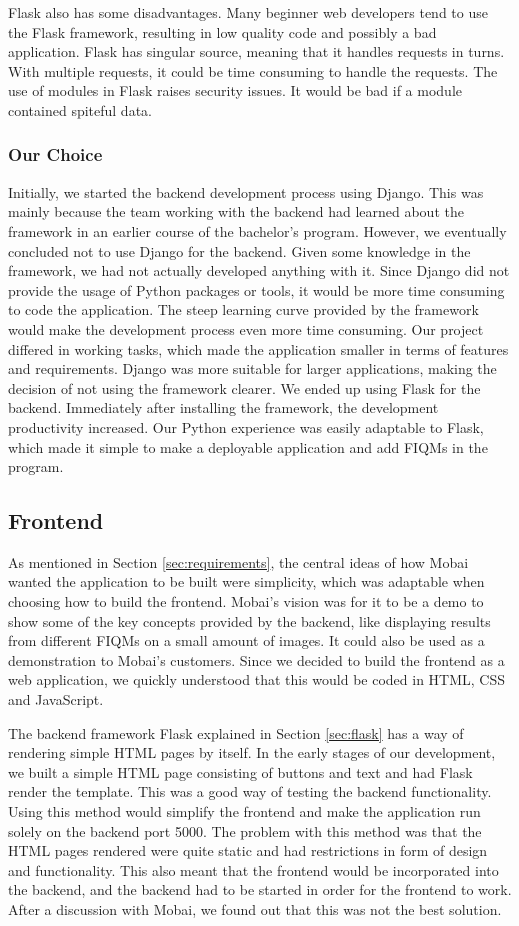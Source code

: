 Flask also has some disadvantages. Many beginner web developers tend to use the Flask framework, resulting in low quality code and possibly a bad application. Flask has singular source, meaning that it handles requests in turns. With multiple requests, it could be time consuming to handle the requests. The use of modules in Flask raises security issues. It would be bad if a module contained spiteful data. 

\subsubsection*{Our Choice}
Initially, we started the backend development process using Django. This was mainly because the team working with the backend had learned about the framework in an earlier course of the bachelor's program. However, we eventually concluded not to use Django for the backend. Given some knowledge in the framework, we had not actually developed anything with it. Since Django did not provide the usage of Python packages or tools, it would be more time consuming to code the application. The steep learning curve provided by the framework would make the development process even more time consuming. Our project differed in working tasks, which made the application smaller in terms of features and requirements. Django was more suitable for larger applications, making the decision of not using the framework clearer. We ended up using Flask for the backend. Immediately after installing the framework, the development productivity increased. Our Python experience was easily adaptable to Flask, which made it simple to make a deployable application and add FIQMs in the program. 

\subsection{Frontend}
As mentioned in Section \ref{sec:requirements}, the central ideas of how Mobai wanted the application to be built were simplicity, which was adaptable when choosing how to build the frontend. Mobai's vision was for it to be a demo to show some of the key concepts provided by the backend, like displaying results from different FIQMs on a small amount of images. It could also be used as a demonstration to Mobai's customers. Since we decided to build the frontend as a web application, we quickly understood that this would be coded in HTML, CSS and JavaScript. 

The backend framework Flask explained in Section \ref{sec:flask} has a way of rendering simple HTML pages by itself. In the early stages of our development, we built a simple HTML page consisting of buttons and text and had Flask render the template. This was a good way of testing the backend functionality. Using this method would simplify the frontend and make the application run solely on the backend port 5000. The problem with this method was that the HTML pages rendered were quite static and had restrictions in form of design and functionality. This also meant that the frontend would be incorporated into the backend, and the backend had to be started in order for the frontend to work. After a discussion with Mobai, we found out that this was not the best solution. 

